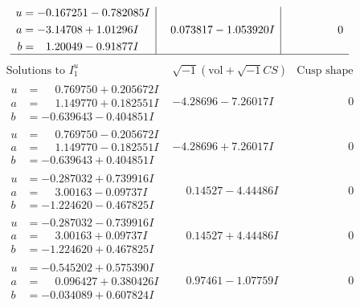 \documentclass[1p]{elsarticle_modified}
\theoremstyle{definition}
\newcommand{\I}{\sqrt{-1}}
\begin{document}
$$\begin{array}{c|c|c}
\begin{aligned}
u &= -0.167251 - 0.782085 I \\
a &= -3.14708 + 1.01296 I \\
b &= \phantom{-}1.20049 - 0.91877 I\end{aligned}
 & \phantom{-}0.073817 - 1.053920 I & \phantom{-0.000000 } 0\\
 \hline 
 \end{array}$$\newpage$$\begin{array}{c|c|c}  
\text{Solutions to }I^u_{1}& \I (\text{vol} + \sqrt{-1}CS) & \text{Cusp shape}\\
 \hline 
\begin{aligned}
u &= \phantom{-}0.769750 + 0.205672 I \\
a &= \phantom{-}1.149770 + 0.182551 I \\
b &= -0.639643 - 0.404851 I\end{aligned}
 & -4.28696 - 7.26017 I & \phantom{-0.000000 } 0 \\ \hline\begin{aligned}
u &= \phantom{-}0.769750 - 0.205672 I \\
a &= \phantom{-}1.149770 - 0.182551 I \\
b &= -0.639643 + 0.404851 I\end{aligned}
 & -4.28696 + 7.26017 I & \phantom{-0.000000 } 0 \\ \hline\begin{aligned}
u &= -0.287032 + 0.739916 I \\
a &= \phantom{-}3.00163 - 0.09737 I \\
b &= -1.224620 - 0.467825 I\end{aligned}
 & \phantom{-}0.14527 - 4.44486 I & \phantom{-0.000000 } 0 \\ \hline\begin{aligned}
u &= -0.287032 - 0.739916 I \\
a &= \phantom{-}3.00163 + 0.09737 I \\
b &= -1.224620 + 0.467825 I\end{aligned}
 & \phantom{-}0.14527 + 4.44486 I & \phantom{-0.000000 } 0 \\ \hline\begin{aligned}
u &= -0.545202 + 0.575390 I \\
a &= \phantom{-}0.096427 + 0.380426 I \\
b &= -0.034089 + 0.607824 I\end{aligned}
 & \phantom{-}0.97461 - 1.07759 I & \phantom{-0.000000 } 0 \\ \hline\begin{aligned}

\end{aligned}
\end{array}$$
\end{document}
